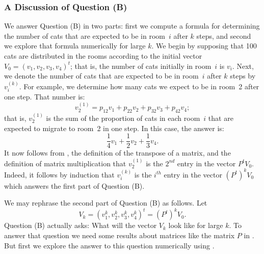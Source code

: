 \documentclass{ximera}
\begin{document}
\subsubsection*{A Discussion of Question (B)}

We answer Question (B) in two parts: first we compute a formula for
determining the number of cats that are expected to be in room~$i$ after $k$
steps, and second we explore that formula numerically for large $k$.  We
begin by supposing that 100 cats are distributed in the rooms according to
the initial vector $V_0=(v_1,v_2,v_3,v_4)^t$; that is, the number of cats
initially in room~$i$ is $v_i$.  Next, we denote the number of cats that are
expected to be in room~$i$ after $k$ steps by $v_i^{(k)}$.  For example, we
determine how many cats we expect to be in room~2 after one step.  That
number is:
\begin{equation} \label{E:probt2}
v_2^{(1)}=p_{12}v_1 + p_{22}v_2 + p_{32}v_3 + p_{42}v_4;
\end{equation}
that is, $v_2^{(1)}$ is the sum of the proportion of cats in each room~$i$
that are expected to migrate to room~2 in one step.  In this case, the answer
is:
\[
\frac{1}{4}v_1 + \frac{1}{2}v_2 + \frac{1}{3}v_4.
\]
It now follows from , the definition of the transpose of a
matrix, and the definition of matrix multiplication that $v_2^{(1)}$ is
the $2^{nd}$ entry in the vector $P^tV_0$.  Indeed, it follows by induction
that $v_i^{(k)}$ is the $i^{th}$ entry in the vector $(P^t)^kV_0$ which
answers the first part of Question (B).

We may rephrase the second part of Question (B) as follows.  Let
\[
V_k = (v_1^{k},v_2^{k},v_3^{k},v_4^{k})^t = (P^t)^kV_0.
\]
Question (B) actually asks: What will the vector $V_k$ look like for
large $k$.  To answer that question we need some results about matrices
like the matrix $P$ in .  But first we explore the answer to
this question numerically using \Matlabp.
\end{document}
